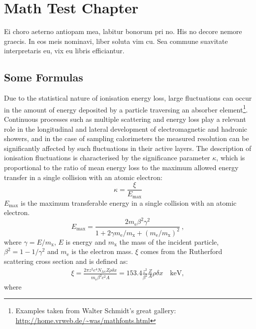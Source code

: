 \chapter{Math Test Chapter}\label{ch:mathtest} %
Ei choro aeterno antiopam mea, labitur bonorum pri no. His no decore
nemore graecis. In eos meis nominavi, liber soluta vim cu. Sea commune
suavitate interpretaris eu, vix eu libris efficiantur.

\section{Some Formulas}
Due to the statistical nature of ionisation energy loss, large
fluctuations can occur in the amount of energy deposited by a particle
traversing an absorber element\footnote{Examples taken from Walter
Schmidt's great gallery: \\
\url{http://home.vrweb.de/~was/mathfonts.html}}.  Continuous processes
such as multiple
scattering and energy loss play a relevant role in the longitudinal
and lateral development of electromagnetic and hadronic
showers, and in the case of sampling calorimeters the
measured resolution can be significantly affected by such fluctuations
in their active layers.  The description of ionisation fluctuations is
characterised by the significance parameter $\kappa$, which is
proportional to the ratio of mean energy loss to the maximum allowed
energy transfer in a single collision with an atomic electron:
\begin{equation}
\kappa =\frac{\xi}{E_{\textrm{max}}} %
\end{equation}
$E_{\textrm{max}}$ is the maximum transferable energy in a single
collision with an atomic electron.
\[
E_{\textrm{max}} =\frac{2 m_{\textrm{e}} \beta^2\gamma^2 }{1 +
2\gamma m_{\textrm{e}}/m_{\textrm{x}} + \left ( m_{\textrm{e}}
/m_{\textrm{x}}\right)^2}\ ,
\]
where $\gamma = E/m_{\textrm{x}}$, $E$ is energy and
$m_{\textrm{x}}$ the mass of the incident particle,
$\beta^2 = 1 - 1/\gamma^2$ and $m_{\textrm{e}}$ is the electron mass.
$\xi$ comes from the Rutherford scattering cross section
and is defined as:
\begin{eqnarray*} \xi  = \frac{2\pi z^2 e^4 N_{\textrm{Av}} Z \rho
\delta x}{m_{\textrm{e}} \beta^2 c^2 A} =  153.4 \frac{z^2}{\beta^2}
\frac{Z}{A}
  \rho \delta x \quad\textrm{keV},
\end{eqnarray*}
where

